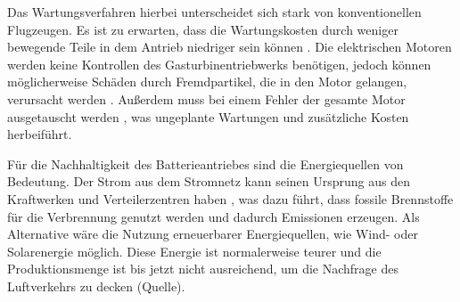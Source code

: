 



Das Wartungsverfahren hierbei unterscheidet sich stark von konventionellen Flugzeugen. 
Es ist zu erwarten, dass die Wartungskosten durch weniger bewegende Teile in dem Antrieb niedriger sein können \cite{dalmia2022powering}. 
%
Die elektrischen Motoren werden keine Kontrollen des Gasturbinentriebwerks benötigen, %
jedoch können möglicherweise Schäden durch Fremdpartikel, die in den Motor gelangen, verursacht werden \cite{reimers2018introduction}.
Außerdem muss bei einem Fehler der gesamte Motor ausgetauscht werden \cite{dalmia2022powering}, 
was ungeplante Wartungen und zusätzliche Kosten herbeiführt.

Für die Nachhaltigkeit des Batterieantriebes sind die Energiequellen von Bedeutung. 
Der Strom aus dem Stromnetz kann seinen Ursprung aus 
den Kraftwerken und Verteilerzentren haben \cite{dalmia2022powering},
was dazu führt, dass fossile Brennstoffe für die Verbrennung genutzt 
werden und dadurch Emissionen erzeugen. 
Als Alternative wäre die Nutzung erneuerbarer Energiequellen, 
wie Wind- oder Solarenergie möglich. 
Diese Energie ist normalerweise teurer und die Produktionsmenge 
ist bis jetzt nicht ausreichend, um die Nachfrage des Luftverkehrs zu decken (Quelle).
